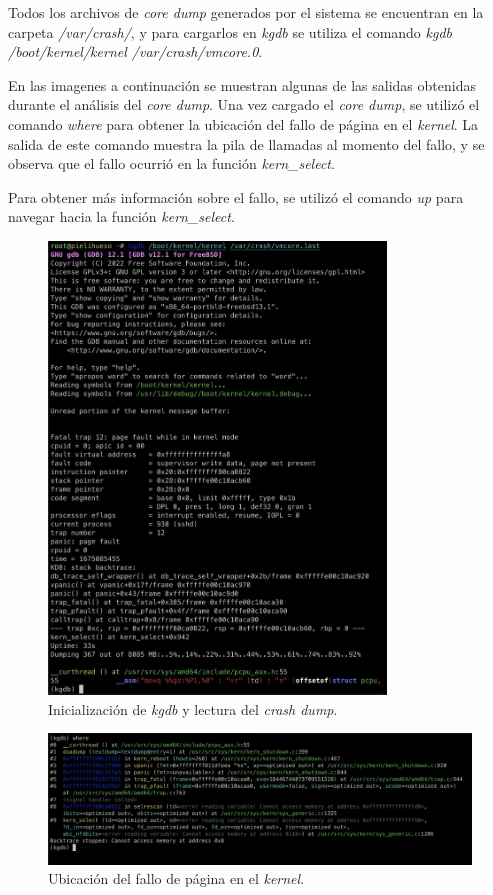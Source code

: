 Todos los archivos de \textit{core dump} generados por el sistema se encuentran en la carpeta \textit{/var/crash/}, y para cargarlos en \textit{kgdb} se utiliza el comando \textit{kgdb /boot/kernel/kernel /var/crash/vmcore.0}.

En las imagenes a continuación se muestran algunas de las salidas obtenidas durante el análisis del \textit{core dump}. Una vez cargado el \textit{core dump}, se utilizó el comando \textit{where} para obtener la ubicación del fallo de página en el \textit{kernel}. La salida de este comando muestra la pila de llamadas al momento del fallo, y se observa que el fallo ocurrió en la función \textit{kern\_select}.

Para obtener más información sobre el fallo, se utilizó el comando \textit{up} para navegar hacia la función \textit{kern\_select}.

\begin{figure}[H]
    \centering
    \includegraphics[width=0.8\textwidth]{images/kgdb_init.jpeg}
    \caption{Inicialización de \textit{kgdb} y lectura del \textit{crash dump}.}
    \label{fig:kgdb_init}
\end{figure}

\vspace{.50cm}
\begin{figure}[H]
    \centering
    \includegraphics[width=1\textwidth]{images/kgdb_where.jpeg}
    \caption{Ubicación del fallo de página en el \textit{kernel}.}
    \label{fig:kgdb_where}
\end{figure}

